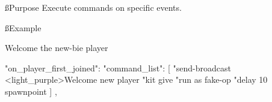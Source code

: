 
\ss{Purpose}
Execute commands on specific events.

\ss{Example}

\begin{example}{Welcome the new-bie player}
    \begin{json}
        "on_player_first_joined": {
            "command_list": [
            "send-broadcast <light_purple>Welcome new player %
            "kit give %
            "run as fake-op %
            "delay 10 spawnpoint %
            ]
        },
    \end{json}
\end{example}